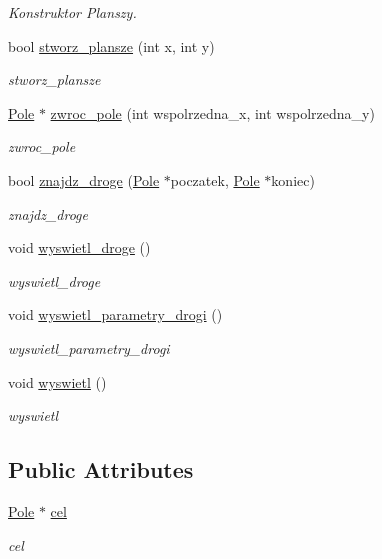 \begin{DoxyCompactItemize}
\begin{DoxyCompactList}\small\item\em Konstruktor Planszy. \end{DoxyCompactList}\item 
bool \hyperlink{class_plansza_ab9e7c8dc7e1b636f1a96a515e2e37d8b}{stworz\+\_\+plansze} (int x, int y)
\begin{DoxyCompactList}\small\item\em stworz\+\_\+plansze \end{DoxyCompactList}\item 
\hyperlink{class_pole}{Pole} $\ast$ \hyperlink{class_plansza_ad91a7151ed6bf0679c98836334631311}{zwroc\+\_\+pole} (int wspolrzedna\+\_\+x, int wspolrzedna\+\_\+y)
\begin{DoxyCompactList}\small\item\em zwroc\+\_\+pole \end{DoxyCompactList}\item 
bool \hyperlink{class_plansza_aad21f32982bf1fde5cf8665508242c47}{znajdz\+\_\+droge} (\hyperlink{class_pole}{Pole} $\ast$poczatek, \hyperlink{class_pole}{Pole} $\ast$koniec)
\begin{DoxyCompactList}\small\item\em znajdz\+\_\+droge \end{DoxyCompactList}\item 
void \hyperlink{class_plansza_ac203f389b69c998b621ee058094f71ac}{wyswietl\+\_\+droge} ()
\begin{DoxyCompactList}\small\item\em wyswietl\+\_\+droge \end{DoxyCompactList}\item 
void \hyperlink{class_plansza_a397e24fb6a0bd9e72d94852b93532332}{wyswietl\+\_\+parametry\+\_\+drogi} ()
\begin{DoxyCompactList}\small\item\em wyswietl\+\_\+parametry\+\_\+drogi \end{DoxyCompactList}\item 
void \hyperlink{class_plansza_aa3a824f5472daf5bd319393b0ed55948}{wyswietl} ()
\begin{DoxyCompactList}\small\item\em wyswietl \end{DoxyCompactList}\end{DoxyCompactItemize}
\subsection*{Public Attributes}
\begin{DoxyCompactItemize}
\item 
\hyperlink{class_pole}{Pole} $\ast$ \hyperlink{class_plansza_a1a2574ca93b7df2633c33194ca7bb0a7}{cel}
\begin{DoxyCompactList}\small\item\em cel \end{DoxyCompactList}\end{DoxyCompactItemize}
